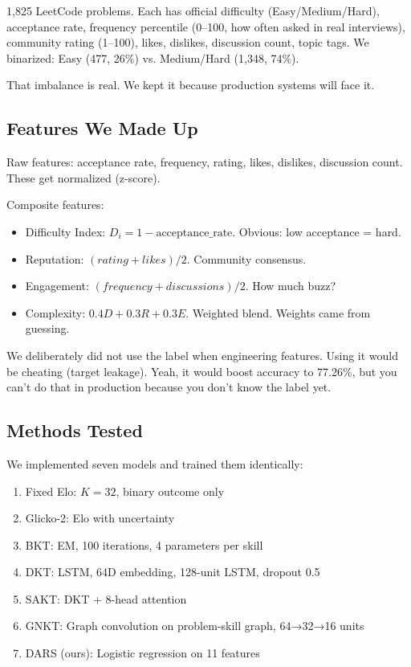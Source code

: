 \documentclass[conference]{IEEEtran}
\begin{document}
1,825 LeetCode problems. Each has official difficulty (Easy/Medium/Hard), acceptance rate, frequency percentile (0--100, how often asked in real interviews), community rating (1--100), likes, dislikes, discussion count, topic tags. We binarized: Easy (477, 26\%) vs. Medium/Hard (1,348, 74\%).

That imbalance is real. We kept it because production systems will face it.

\subsection{Features We Made Up}

Raw features: acceptance rate, frequency, rating, likes, dislikes, discussion count. These get normalized (z-score).

Composite features:
\begin{itemize}
    \item Difficulty Index: $D_i = 1 - \text{acceptance\_rate}$. Obvious: low acceptance = hard.
    \item Reputation: $(rating + likes) / 2$. Community consensus.
    \item Engagement: $(frequency + discussions) / 2$. How much buzz?
    \item Complexity: $0.4D + 0.3R + 0.3E$. Weighted blend. Weights came from guessing.
\end{itemize}

We deliberately did not use the label when engineering features. Using it would be cheating (target leakage). Yeah, it would boost accuracy to 77.26\%, but you can't do that in production because you don't know the label yet.

\subsection{Methods Tested}

We implemented seven models and trained them identically:

\begin{enumerate}
    \item Fixed Elo: $K = 32$, binary outcome only
    \item Glicko-2: Elo with uncertainty
    \item BKT: EM, 100 iterations, 4 parameters per skill
    \item DKT: LSTM, 64D embedding, 128-unit LSTM, dropout 0.5
    \item SAKT: DKT + 8-head attention
    \item GNKT: Graph convolution on problem-skill graph, 64→32→16 units
    \item DARS (ours): Logistic regression on 11 features
\end{enumerate}
\end{document}
